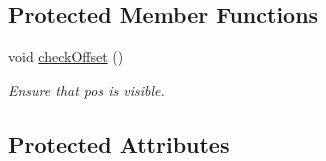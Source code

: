 \subsection*{Protected Member Functions}
\begin{DoxyCompactItemize}
\item 
\hypertarget{classGUI_1_1Input_ab081f47beee40c4872ac7728623b3e82}{void \hyperlink{classGUI_1_1Input_ab081f47beee40c4872ac7728623b3e82}{check\-Offset} ()}\label{classGUI_1_1Input_ab081f47beee40c4872ac7728623b3e82}

\begin{DoxyCompactList}\small\item\em Ensure that pos is visible. \end{DoxyCompactList}\end{DoxyCompactItemize}
\subsection*{Protected Attributes}
